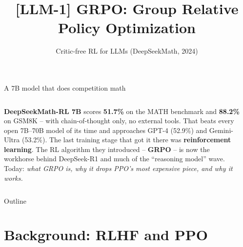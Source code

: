 \documentclass[aspectratio=169]{beamer}
\title{[LLM-1] GRPO: Group Relative Policy Optimization}
\subtitle{Critic-free RL for LLMs \quad(DeepSeekMath, 2024)}
\date{}
\begin{document}
\begin{frame}{A 7B model that does competition math}
  \begin{columns}[T]
    \textbf{DeepSeekMath-RL 7B} scores \textbf{51.7\%} on the MATH benchmark and
    \textbf{88.2\%} on GSM8K -- with chain-of-thought only, no external tools.
    \vskip 4pt
    That beats every open 7B--70B model of its time and approaches
    GPT-4 (52.9\%) and Gemini-Ultra (53.2\%).
    \vskip 8pt
    The last training stage that got it there was \textbf{reinforcement learning}.
    The RL algorithm they introduced -- \textbf{GRPO} -- is now the workhorse behind
    DeepSeek-R1 and much of the ``reasoning model'' wave.
    \vskip 8pt
    Today: \emph{what GRPO is, why it drops PPO's most expensive piece, and why it works.}
    \begin{center}
    \end{center}
  \end{columns}
\end{frame}

\begin{frame}{Outline}
  \tableofcontents
\end{frame}

\section{Background: RLHF and PPO}
\end{document}
